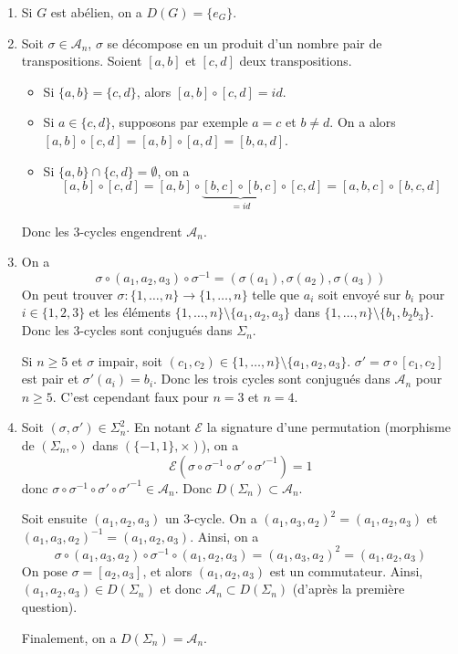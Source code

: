 \begin{solution}
	\phantom{}
	\begin{enumerate}
		\item Si $G$ est abélien, on a $D(G)=\{e_{G}\}$.
		\item Soit $\sigma\in\mathcal{A}_{n}$, $\sigma$ se décompose en un produit d'un nombre pair de transpositions. Soient $[a,b]$ et $[c,d]$ deux transpositions.
		\begin{itemize}
			\item Si $\{a,b\}=\{c,d\}$, alors $[a,b]\circ[c,d]=id$.
			\item Si $a\in\{c,d\}$, supposons par exemple $a=c$ et $b\neq d$. On a alors $[a,b]\circ[c,d]=[a,b]\circ[a,d]=[b,a,d]$.
			\item Si $\{a,b\}\cap\{c,d\}=\emptyset$, on a 
			$$[a,b]\circ[c,d]=[a,b]\circ\underbrace{[b,c]\circ[b,c]}_{=id}\circ[c,d]=[a,b,c]\circ[b,c,d]$$
		\end{itemize}
		Donc les $3$-cycles engendrent $\mathcal{A}_{n}$.

		\item On a 
		$$\sigma\circ(a_{1},a_{2},a_{3})\circ\sigma^{-1}=(\sigma(a_{1}),\sigma(a_{2}),\sigma(a_{3}))$$
		On peut trouver $\sigma\colon\{1,\dots,n\}\to\{1,\dots,n\}$ telle que $a_{i}$ soit envoyé sur $b_{i}$ pour $i\in\{1,2,3\}$ et les éléments $\{1,\dots,n\}\setminus\{a_{1},a_{2},a_{3}\}$ dans $\{1,\dots,n\}\setminus\{b_{1},b_{2}b_{3}\}$.
		Donc les 3-cycles sont conjugués dans $\Sigma_{n}$.

		Si $n\geqslant5$ et $\sigma$ impair, soit $(c_{1},c_{2})\in\{1,\dots,n\}\setminus\{a_{1},a_{2},a_{3}\}$. $\sigma'=\sigma\circ[c_{1},c_{2}]$ est pair et $\sigma'(a_{i})=b_{i}$. Donc les trois cycles sont conjugués dans $\mathcal{A}_{n}$ pour $n\geqslant5$. C'est cependant faux pour $n=3$ et $n=4$.

		\item Soit $(\sigma,\sigma')\in\Sigma_{n}^{2}$. En notant $\mathcal{E}$ la signature d'une permutation (morphisme de $(\Sigma_{n},\circ)$ dans $(\{-1,1\},\times)$), on a
		$$\mathcal{E}(\sigma\circ\sigma^{-1}\circ\sigma'\circ\sigma'^{-1})=1$$
		donc $\sigma\circ\sigma^{-1}\circ\sigma'\circ\sigma'^{-1}\in\mathcal{A}_{n}$. Donc $D(\Sigma_{n})\subset\mathcal{A}_{n}$.

		Soit ensuite $(a_{1},a_{2},a_{3})$ un 3-cycle. On a $(a_{1},a_{3},a_{2})^{2}=(a_{1},a_{2},a_{3})$ et $(a_{1},a_{3},a_{2})^{-1}=(a_{1},a_{2},a_{3})$. Ainsi, on a 
		$$\sigma\circ(a_{1},a_{3},a_{2})\circ\sigma^{-1}\circ(a_{1},a_{2},a_{3})=(a_{1},a_{3},a_{2})^{2}=(a_{1},a_{2},a_{3})$$
		On pose $\sigma=[a_{2},a_{3}]$, et alors $(a_{1},a_{2},a_{3})$ est un commutateur. Ainsi, $(a_{1},a_{2},a_{3})\in D(\Sigma_{n})$ et donc $\mathcal{A}_{n}\subset D(\Sigma_{n})$ (d'après la première question).

		Finalement, on a $D(\Sigma_{n})=\mathcal{A}_{n}$.
	\end{enumerate}
\end{solution}

